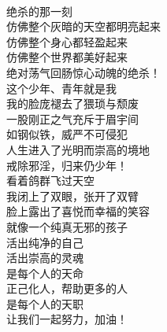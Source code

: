 \begin{poem}[崇高的灵魂]
\begin{multicols}{3}
\begin{center}
 \\ 绝杀的那一刻 \\ 仿佛整个灰暗的天空都明亮起来 \\ 仿佛整个身心都轻盈起来 \\ 仿佛整个世界都美好起来 \\ 绝对荡气回肠惊心动魄的绝杀！ \\ 这个少年、青年就是我 \\ 我的脸庞褪去了猥琐与颓废 \\ 一股刚正之气充斥于眉宇间 \\ 如钢似铁，威严不可侵犯 \\ 人生进入了光明而崇高的境地 \\ 戒除邪淫，归来仍少年！ \\ 看着鸽群飞过天空 \\ 我闭上了双眼，张开了双臂 \\ 脸上露出了喜悦而幸福的笑容 \\ 就像一个纯真无邪的孩子 \\ 活出纯净的自己 \\ 活出崇高的灵魂 \\ 是每个人的天命 \\ 正己化人，帮助更多的人 \\ 是每个人的天职 \\ 让我们一起努力，加油！
        \end{center}
    \end{multicols}
\end{poem}
